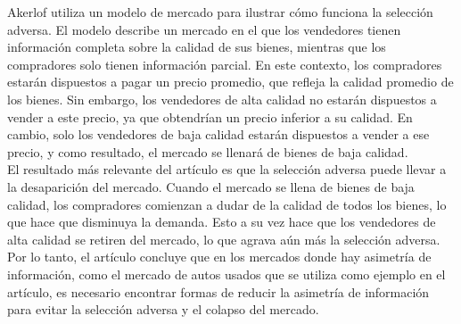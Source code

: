\begin{enumerate}[\bfseries 1.]
    Akerlof utiliza un modelo de mercado para ilustrar cómo funciona la selección adversa. El modelo describe un mercado en el que los vendedores tienen información completa sobre la calidad de sus bienes, mientras que los compradores solo tienen información parcial. En este contexto, los compradores estarán dispuestos a pagar un precio promedio, que refleja la calidad promedio de los bienes. Sin embargo, los vendedores de alta calidad no estarán dispuestos a vender a este precio, ya que obtendrían un precio inferior a su calidad. En cambio, solo los vendedores de baja calidad estarán dispuestos a vender a ese precio, y como resultado, el mercado se llenará de bienes de baja calidad.\\

    El resultado más relevante del artículo es que la selección adversa puede llevar a la desaparición del mercado. Cuando el mercado se llena de bienes de baja calidad, los compradores comienzan a dudar de la calidad de todos los bienes, lo que hace que disminuya la demanda. Esto a su vez hace que los vendedores de alta calidad se retiren del mercado, lo que agrava aún más la selección adversa. Por lo tanto, el artículo concluye que en los mercados donde hay asimetría de información, como el mercado de autos usados que se utiliza como ejemplo en el artículo, es necesario encontrar formas de reducir la asimetría de información para evitar la selección adversa y el colapso del mercado.

\end{enumerate}
